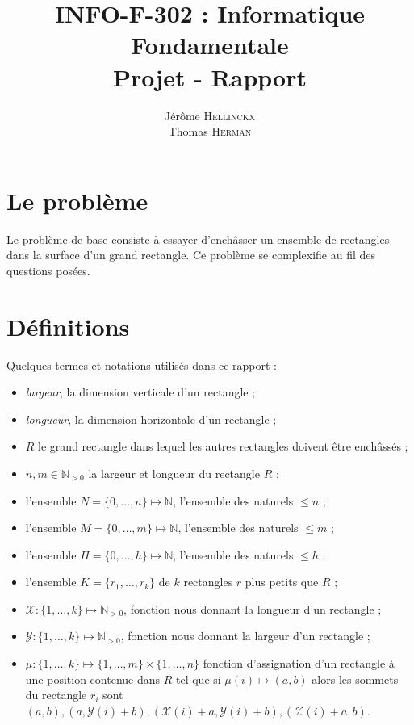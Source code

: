 \documentclass[a4paper]{article}
\title{{\textsc{INFO-F-302} : Informatique Fondamentale} \\ Projet - Rapport}
\author{Jérôme \textsc{Hellinckx} \\ Thomas \textsc{Herman}}
\begin{document}
\renewcommand{\labelitemi}{$\bullet$}

\maketitle

\section{Le problème}
Le problème de base consiste à essayer d'enchâsser un ensemble de rectangles dans la surface d'un grand rectangle. Ce problème se complexifie au fil des questions posées. 

\section{Définitions}
Quelques termes et notations utilisés dans ce rapport : 
\begin{itemize}
	\item \textit{largeur}, la dimension verticale d'un rectangle ;
	\item \textit{longueur}, la dimension horizontale d'un rectangle ;
	\item $R$ le grand rectangle dans lequel les autres rectangles doivent être enchâssés ;
	\item $ n,m \in \mathbb{N}_{>0} $ la largeur et longueur du rectangle $R$ ;
    \item l'ensemble $N = \{0,\dots,n\} \mapsto \mathbb{N}$, l'ensemble des naturels $\leq n$ ;
    \item l'ensemble $M = \{0,\dots,m\} \mapsto \mathbb{N}$, l'ensemble des naturels $\leq m$ ;
        \item l'ensemble $H = \{0,\dots,h\} \mapsto \mathbb{N}$, l'ensemble des naturels $\leq h$ ;
	\item l'ensemble $K = \{r_1,\dots ,r_k\}$ de $k$ rectangles $r$ plus petits que $R$ ;
	\item $\mathcal{X}:\{1,\dots,k\} \mapsto \mathbb{N}_{>0} $, fonction nous donnant la longueur d'un rectangle ;
	\item $\mathcal{Y}:\{1,\dots,k\} \mapsto \mathbb{N}_{>0} $, fonction nous donnant la largeur d'un rectangle ;
	\item $\mu :\{1,\dots,k\} \mapsto \{1,\dots,m\}\times\{1,\dots,n\}$ fonction d'assignation d'un rectangle à une position contenue dans $R$ tel que si $\mu(i) \mapsto (a,b)$ alors les sommets du rectangle $r_i$ sont $(a,b), (a,\mathcal{Y}(i)+b), (\mathcal{X}(i)+a,\mathcal{Y}(i)+b), (\mathcal{X}(i)+a,b)$.\\
	
	
\end{itemize}
\end{document}
